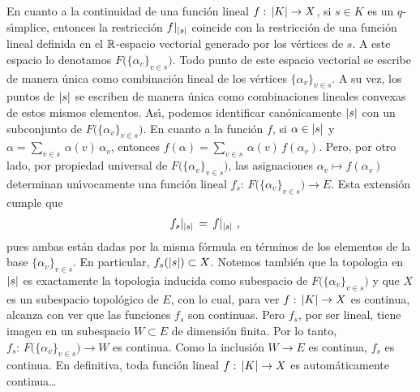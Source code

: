 En cuanto a la continuidad de una funci\'{o}n lineal
$f:\,\left|K\right|\rightarrow X$, si $s\in K$ es un $q$-s\'{\i}mplice, entonces la
restricci\'{o}n $f|_{\left|s\right|}$ coincide con la restricci\'{o}n de una
funci\'{o}n lineal definida en el $\mathbb{R}$-espacio vectorial generado
por los v\'{e}rtices de $s$. A este espacio lo denotamos
$F\big(\{\alpha_{v}\}_{v\in s}\big)$. Todo punto de este espacio vectorial se
escribe de manera \'{u}nica como combinaci\'{o}n lineal de los v\'{e}rtices
$\{\alpha_{v}\}_{v\in s}$. A su vez, los puntos de $\left|s\right|$ se escriben
de manera \'{u}nica como combinaciones lineales convexas de estos mismos
elementos. As\'{\i}, podemos identificar can\'{o}nicamente $\left|s\right|$
con un subconjunto de $F\big(\{\alpha_{v}\}_{v\in s}\big)$. En cuanto a la
funci\'{o}n $f$, si $\alpha\in\left|s\right|$ y
$\alpha=\sum_{v\in s}\,\alpha(v)\,\alpha_{v}$, entonces
$f(\alpha)=\sum_{v\in s}\,\alpha(v)\,f(\alpha_{v})$. Pero, por otro lado,
por propiedad universal de $F\big(\{\alpha_{v}\}_{v\in s}\big)$, las
asignaciones $\alpha_{v}\mapsto f(\alpha_{v})$ determinan un\'{\i}vocamente
una funci\'{o}n lineal
$f_{s}:\,F\big(\{\alpha_{v}\}_{v\in s}\big)\rightarrow E$. Esta extensi\'{o}n
cumple que
\begin{align*}
	f_{s}|_{\left|s\right|} & \,=\,f|_{\left|s\right|}
	\text{ ,}
\end{align*}
%
pues ambas est\'{a}n dadas por la misma f\'{o}rmula en t\'{e}rminos de los
elementos de la base $\{\alpha_{v}\}_{v\in s}$. En particular,
$f_{s}(\left|s\right|)\subset X$. Notemos tambi\'{e}n que la topolog\'{\i}a en
$\left|s\right|$ es exactamente la topolog\'{\i}a inducida como subespacio de
$F\big(\{\alpha_{v}\}_{v\in s}\big)$ y que $X$ es un subespacio topol\'{o}gico
de $E$, con lo cual, para ver $f:\,\left|K\right|\rightarrow X$ es continua,
alcanza con ver que las funciones $f_{s}$ son continuas. Pero $f_{s}$, por
ser lineal, tiene imagen en un subespacio $W\subset E$ de dimensi\'{o}n
finita. Por lo tanto,
$f_{s}:\,F\big(\{\alpha_{v}\}_{v\in s}\big)\rightarrow W$ es continua.
Como la inclusi\'{o}n $W\rightarrow E$ es continua, $f_{s}$ es continua.
En definitiva, toda funci\'{o}n lineal $f:\,\left|K\right|\rightarrow X$ es
autom\'{a}ticamente continua\dots

